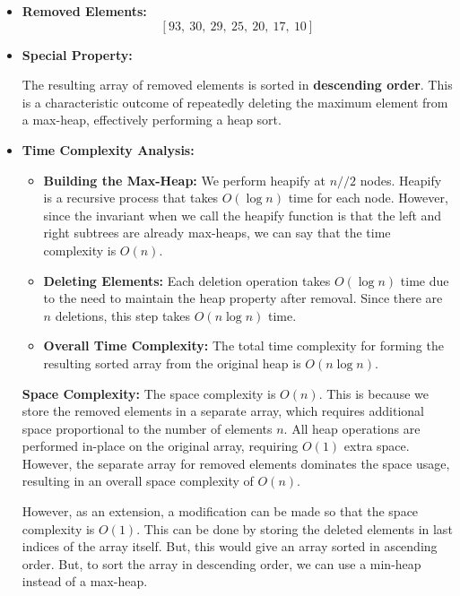 \documentclass{cs1204}
\begin{document}
\begin{itemize}
    \item \textbf{Removed Elements:}
    \[
    [93, \ 30, \ 29, \ 25, \ 20, \ 17, \ 10]
    \]
    
    \item \textbf{Special Property:}
    
    The resulting array of removed elements is sorted in \textbf{descending order}. This is a characteristic outcome of repeatedly deleting the maximum element from a max-heap, effectively performing a heap sort.
    
    \item \textbf{Time Complexity Analysis:}
    
    \begin{itemize}
        \setlength{\itemsep}{1em}
        \item \textbf{Building the Max-Heap:} We perform heapify at \(n // 2\) nodes. Heapify is a recursive process that takes \(O(\log n)\) time for each node. However, since the invariant when we call the heapify function is that the left and right subtrees are already max-heaps, we can say that the time complexity is \(O(n)\).
    
        \item \textbf{Deleting Elements:} Each deletion operation takes \(O(\log n)\) time due to the need to maintain the heap property after removal. Since there are \(n\) deletions, this step takes \(O(n \log n)\) time.
    
        \item \textbf{Overall Time Complexity:} The total time complexity for forming the resulting sorted array from the original heap is \(O(n \log n)\).
    \end{itemize}


    \textbf{Space Complexity:} The space complexity is \(O(n)\). This is because we store the removed elements in a separate array, which requires additional space proportional to the number of elements \(n\). All heap operations are performed in-place on the original array, requiring \(O(1)\) extra space. However, the separate array for removed elements dominates the space usage, resulting in an overall space complexity of \(O(n)\).
    

    However, as an extension, a modification can be made so that the space complexity is \(O(1)\). This can be done by storing the deleted elements in last indices of the array itself. But, this would give an array sorted in ascending order. But, to sort the array in descending order, we can use a min-heap instead of a max-heap.
\end{itemize}
\end{document}

